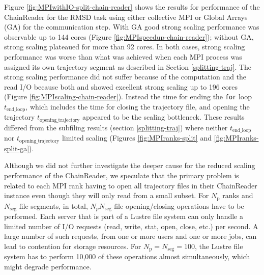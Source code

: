 Figure \ref{fig:MPIwithIO-split-chain-reader} shows the results for performance of the ChainReader for the RMSD task using either collective MPI or Global Arrays (GA) for the communication step.
With GA good strong scaling performance was observable up to 144 cores (Figure \ref{fig:MPIspeedup-chain-reader}); without GA, strong scaling plateaued for more than 92 cores.
In both cases, strong scaling performance was worse than what was achieved when each MPI process was assigned its own trajectory segment as described in Section \ref{splitting-traj}. 
The strong scaling performance did not suffer because of the computation and the read I/O because both \tcomp and \tIO showed excellent strong scaling up to 196 cores (Figure \ref{fig:MPIscaling-chain-reader}).
Instead the time for ending the \texttt{for} loop $t_{\text{end\_loop}}$, which includes the time for closing the trajectory file, and opening the trajectory $t_{\text{opening\_trajectory}}$ appeared to be the scaling bottleneck.
These results differed from the subfiling results (section \ref{splitting-traj}) where neither $t_{\text{end\_loop}}$ nor $t_{\text{opening\_trajectory}}$ limited scaling (Figures \ref{fig:MPIranks-split} and \ref{fig:MPIranks-split-ga}). 

Although we did not further investigate the deeper cause for the reduced scaling performance of the ChainReader, we speculate that the primary problem is related to each MPI rank having to open all trajectory files in their ChainReader instance even though they will only read from a small subset.
For $N_{\text{p}}$ ranks and $N_{\text{seg}}$ file segments, in total, $N_{p } N_{\text{seg}}$ file opening/closing operations have to be performed. 
Each server that is part of a Lustre file system can only handle a limited number of I/O requests (read, write, stat, open, close, etc.) per second.
A large number of such requests, from one or more users and one or more jobs, can lead to contention for storage resources. 
For $N_{\text{p}} = N_{\text{seg}} = 100$, the Lustre file system has to perform 10,000 of these operations almost simultaneously, which might degrade performance. 



